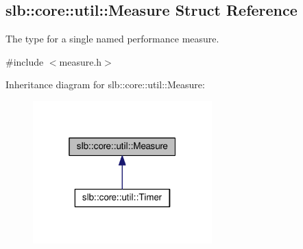\hypertarget{structslb_1_1core_1_1util_1_1Measure}{}\subsection{slb\+:\+:core\+:\+:util\+:\+:Measure Struct Reference}
\label{structslb_1_1core_1_1util_1_1Measure}


The type for a single named performance measure.  




{\ttfamily \#include $<$measure.\+h$>$}



Inheritance diagram for slb\+:\+:core\+:\+:util\+:\+:Measure\+:\nopagebreak
\begin{figure}[H]
\begin{center}
\leavevmode
\includegraphics[width=196pt]{structslb_1_1core_1_1util_1_1Measure__inherit__graph}
\end{center}
\end{figure}
